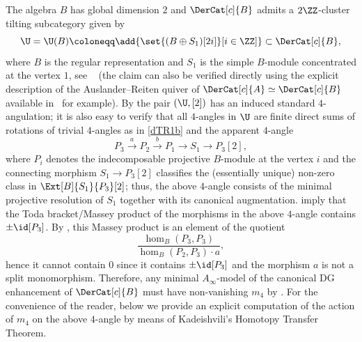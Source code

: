 \documentclass[a4paper]{amsart}
\begin{document}
The algebra $B$ has global dimension $2$ and $\DerCat[c]{B}$ admits a
$2\ZZ$-cluster tilting subcategory given by
\[
  \U=\U(B)\coloneqq\add{\set{(B\oplus S_1)[2i]}[i\in\ZZ]}\subset\DerCat[c]{B},
\]
where $B$ is the regular representation and $S_1$ is the simple $B$-module
concentrated at the vertex $1$, see ~\cite[Cor.~1.15 and Thm.~1.21]{Iya11} (the
claim can also be verified directly using the explicit description of the
Auslander--Reiten quiver of $\DerCat[c]{A}\simeq\DerCat[c]{B}$ available
in~\cite[Sec.~I.5]{Hap88} for example). By  the
pair $(\U,[2])$ has an induced standard $4$-angulation; it is also easy to
verify that all $4$-angles in $\U$ are
finite direct sums of rotations of trivial $4$-angles as in \eqref{dTR1b} and the apparent $4$-angle
\[
  P_3 \stackrel{a}\to P_2\stackrel{b}\to P_1\to S_1\to P_3[2],
\]
where $P_i$ denotes the indecomposable projective $B$-module at the
vertex $i$ and 
the connecting morphism $S_1\to P_3[2]$ classifies the (essentially unique)
non-zero class in $\Ext[B]{S_1}{P_3}[2]$; thus, the above $4$-angle consists of
the minimal projective resolution of $S_1$ together with its canonical augmentation.
 imply that the Toda
bracket/Massey product of the morphisms in the above $4$-angle contains
$\pm\id[P_3]$. By , this Massey product is an element of the quotient 
\[\frac{\hom_B(P_3,P_3)}{\hom_B(P_2,P_3)\cdot a},\]
hence it cannot contain $0$ since it contains $\pm\id[P_3]$ and the morphism $a$
is not a split monomorphism. Therefore, any minimal $A_\infty$-model of the
canonical DG enhancement of $\DerCat[c]{B}$ must have non-vanishing $m_4$ by
. For the convenience of the reader, below we
provide an explicit computation of the action of $m_4$ on the above $4$-angle by
means of Kadeishvili's Homotopy Transfer Theorem.
\end{document}
